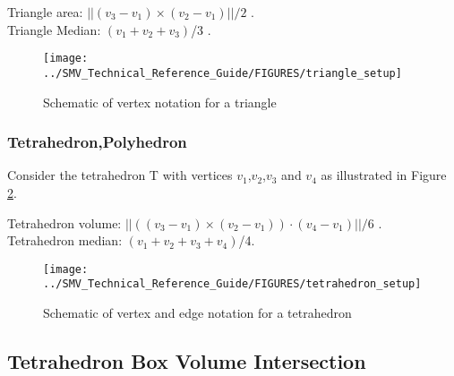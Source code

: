 \documentclass[12pt]{article}
\begin{document}
\noindent Triangle area: $||(v_3-v_1)\times (v_2-v_1)||/2$ . \\
Triangle Median: $(v_1+v_2+v_3)$/3 .

\begin{figure}[\figoptions]
\begin{center}
\texttt{[image: ../SMV\_Technical\_Reference\_Guide/FIGURES/triangle\_setup]}
\end{center}
\caption{Schematic of vertex notation for a triangle}
\label{figure:triangle_setup}
\end{figure}

\subsubsection{Tetrahedron,Polyhedron}
Consider the tetrahedron T with vertices $v_1$,$v_2$,$v_3$ and $v_4$ as illustrated in Figure \ref{figure:tetrahedron_setup}.

\noindent Tetrahedron volume: $||((v_3-v_1)\times (v_2-v_1))\cdot (v_4-v_1)||/6$ .\\
Tetrahedron median: $(v_1+v_2+v_3+v_4)$/4.

\begin{figure}[\figoptions]
\begin{center}
\texttt{[image: ../SMV\_Technical\_Reference\_Guide/FIGURES/tetrahedron\_setup]}
\end{center}
\caption{Schematic of vertex and edge notation for a tetrahedron}
\label{figure:tetrahedron_setup}
\end{figure}


\newcommand{\tetra}{\mbox{tetra\_bounds}}
\newcommand{\bbox}{\mbox{box\_bounds}}
\newcommand{\txtmin}{\mbox{min}}
\newcommand{\txtmax}{\mbox{max}}
\subsection{Tetrahedron Box Volume Intersection}
\end{document}
